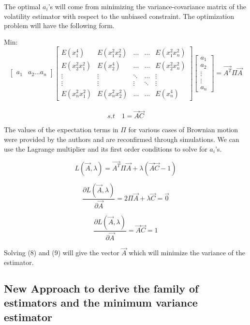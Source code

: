 \documentclass[12pt]{article}   	%
\begin{document}
The optimal $a_i$'s will come from minimizing the variance-covariance matrix of the volatility estimator with respect to 
the unbiased constraint. The optimization problem will have the following form.

Min:$$
	 \begin{bmatrix}
		a_1 & a_2  \dots a_n
	\end{bmatrix} 
	\begin{bmatrix}
	E(x_1^4)&E(x_1^2 x_2^2)&\dots&\dots&E(x_1^2 x_n^2)\\
	E(x_2^2 x_1^2)& E(x_2^4)&\dots&\dots&E(x_2^2 x_n^2)\\
	\vdots&\vdots&\ddots&\dots&\vdots\\
	\vdots&\vdots&\vdots&\ddots&\vdots\\
	E(x_n^2 x_1^2)&E(x_n^2 x_2^2)&\dots&\dots&E(x_n^4)
	\end{bmatrix}
	\begin{bmatrix}
		a_1\\
		a_2\\
		\vdots\\
		\vdots\\
		a_n 
	\end{bmatrix} =  \vec{A^T}\Pi\vec{A} $$ \\
	\begin{equation}
	s.t\quad  1= \vec{A}\vec{C}
\end{equation}


The values of the expectation terms in $\Pi$ for various cases of Brownian motion were provided by the authors and are reconfirmed through simulations. 
We can use the Lagrange multiplier and its first order conditions to solve for $a_i$'s.

\begin{equation}
L(\vec{A},\lambda)=\vec{A^T}  \Pi \vec{A} + \lambda( \vec{A}\vec{C}-1)
\end{equation}

\begin{equation}
	\frac{\partial L(\vec{A},\lambda)}{\partial \vec{A}} = 2\Pi\vec{A}+\lambda \vec{C}=\vec{0} 
	\end{equation}

\begin{equation}
\frac{\partial L(\vec{A},\lambda)}{\partial \vec{A}} = \vec{A}\vec{C}=1
\end{equation}


Solving (8) and (9) will give the vector $\vec{A}$ which will minimize the variance of the estimator.

\subsection{New Approach to derive the family of estimators and the minimum variance estimator}
\end{document}
